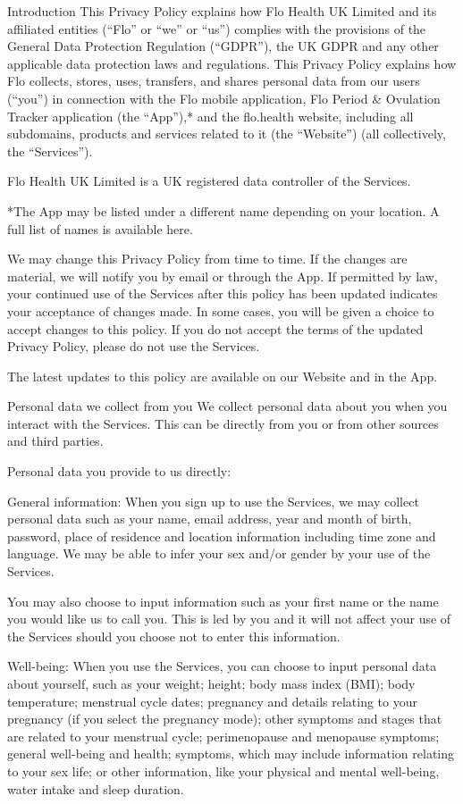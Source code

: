 Introduction
This Privacy Policy explains how Flo Health UK Limited and its affiliated entities (“Flo” or “we” or “us”) complies with the provisions of the General Data Protection Regulation (“GDPR”), the UK GDPR and any other applicable data protection laws and regulations. This Privacy Policy explains how Flo collects, stores, uses, transfers, and shares personal data from our users (“you”) in connection with the Flo mobile application, Flo Period & Ovulation Tracker application (the “App”),* and the flo.health website, including all subdomains, products and services related to it (the “Website”) (all collectively, the “Services”). 

Flo Health UK Limited is a UK registered data controller of the Services.

*The App may be listed under a different name depending on your location. A full list of names is available here. 

We may change this Privacy Policy from time to time. If the changes are material, we will notify you by email or through the App. If permitted by law, your continued use of the Services after this policy has been updated indicates your acceptance of changes made. In some cases, you will be given a choice to accept changes to this policy. If you do not accept the terms of the updated Privacy Policy, please do not use the Services. 

The latest updates to this policy are available on our Website and in the App.

Personal data we collect from you
We collect personal data about you when you interact with the Services. This can be directly from you or from other sources and third parties. 

Personal data you provide to us directly:

General information: When you sign up to use the Services, we may collect personal data such as your name, email address, year and month of birth, password, place of residence and location information including time zone and language. We may be able to infer your sex and/or gender by your use of the Services. 

You may also choose to input information such as your first name or the name you would like us to call you. This is led by you and it will not affect your use of the Services should you choose not to enter this information. 

Well-being: When you use the Services, you can choose to input personal data about yourself, such as your weight; height; body mass index (BMI); body temperature; menstrual cycle dates; pregnancy and details relating to your pregnancy (if you select the pregnancy mode); other symptoms and stages that are related to your menstrual cycle; perimenopause and menopause symptoms; general well-being and health; symptoms, which may include information relating to your sex life; or other information, like your physical and mental well-being, water intake and sleep duration. 


